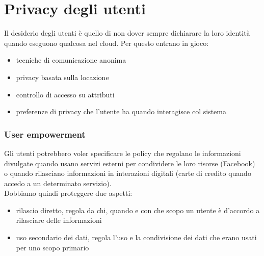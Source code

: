 \section{Privacy degli utenti}
Il desiderio degli utenti è quello di non dover sempre dichiarare la loro identità quando eseguono qualcosa nel cloud. Per questo entrano in gioco:
\begin{itemize}
    \item tecniche di comunicazione anonima
    \item privacy basata sulla locazione
    \item controllo di accesso su attributi
    \item preferenze di privacy che l'utente ha quando interagisce col sistema
\end{itemize}
\subsubsection{User empowerment}
Gli utenti potrebbero voler specificare le policy che regolano le informazioni divulgate quando usano servizi esterni per condividere le loro risorse (Facebook) o quando rilasciano informazioni in interazioni digitali (carte di credito quando accedo a un determinato servizio). \\
Dobbiamo quindi proteggere due aspetti:
\begin{itemize}
    \item rilascio diretto, regola da chi, quando e con che scopo un utente è d'accordo a rilasciare delle informazioni
    \item uso secondario dei dati, regola l'uso e la condivisione dei dati che erano usati per uno scopo primario
\end{itemize}

